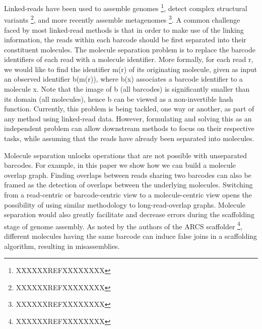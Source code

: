 \documentclass{article}
\begin{document}
Linked-reads have been used to assemble genomes \footnote{XXXXXXREFXXXXXXXX}, detect complex structural variants \footnote{XXXXXXREFXXXXXXXX}, and more
recently assemble metagenomes \footnote{XXXXXXREFXXXXXXXX}. A common challenge faced by most linked-read methods is that in order
to make use of the linking information, the reads within each barcode should be first separated into their
constituent molecules. The molecule separation problem is to replace the barcode identifiers of each read
with a molecule identifier. More formally, for each read r, we would like to find the identifier m(r) of its
originating molecule, given as input an observed identifier b(m(r)), where b(x) associates a barcode identifier
to a molecule x. Note that the image of b (all barcodes) is significantly smaller than its domain (all molecules),
hence b can be viewed as a non-invertible hash function. Currently, this problem is being tackled, one way
or another, as part of any method using linked-read data. However, formulating and solving this as an
independent problem can allow downstream methods to focus on their respective tasks, while assuming that
the reads have already been separated into molecules.

Molecule separation unlocks operations that are not possible with unseparated barcodes. For example,
in this paper we show how we can build a molecule overlap graph. Finding overlaps between reads sharing
two barcodes can also be framed as the detection of overlaps between the underlying molecules. Switching
from a read-centric or barcode-centric view to a molecule-centric view opens the possibility of using similar
methodology to long-read-overlap graphs. Molecule separation would also greatly facilitate and decrease
errors during the scaffolding stage of genome assembly. As noted by the authors of the ARCS scaffolder \footnote{XXXXXXREFXXXXXXXX},
different molecules having the same barcode can induce false joins in a scaffolding algorithm, resulting in
misassemblies.
\end{document}
